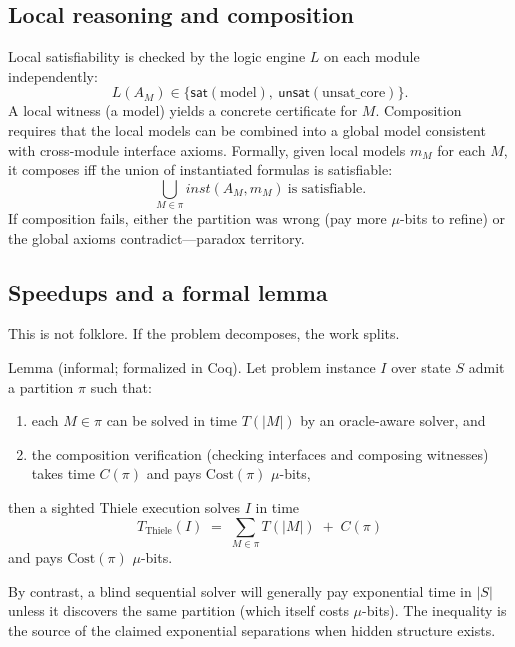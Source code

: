 \documentclass[11pt]{article}
\begin{document}
\subsection{Local reasoning and composition}
Local satisfiability is checked by the logic engine $L$ on each module independently:
\[
L(A_M) \in \{\mathsf{sat}(\text{model}),\ \mathsf{unsat}(\text{unsat\_core})\}.
\]
A local witness (a model) yields a concrete certificate for $M$. Composition requires that the local models can be combined into a global model consistent with cross-module interface axioms. Formally, given local models $m_M$ for each $M$, it composes iff the union of instantiated formulas is satisfiable:
\[
\bigcup_{M\in\pi} \mathit{inst}(A_M,m_M)\ \text{is satisfiable}.
\]
If composition fails, either the partition was wrong (pay more $\mu$-bits to refine) or the global axioms contradict—paradox territory.

\subsection{Speedups and a formal lemma}
This is not folklore. If the problem decomposes, the work splits.

Lemma (informal; formalized in Coq). Let problem instance $I$ over state $S$ admit a partition $\pi$ such that:
\begin{enumerate}
  \item each $M\in\pi$ can be solved in time $T(|M|)$ by an oracle-aware solver, and
  \item the composition verification (checking interfaces and composing witnesses) takes time $C(\pi)$ and pays $\mathrm{Cost}(\pi)$ $\mu$-bits,
\end{enumerate}
then a sighted Thiele execution solves $I$ in time
\[
T_{\mathrm{Thiele}}(I) \;=\; \sum_{M\in\pi} T(|M|) \;+\; C(\pi)
\]
and pays $\mathrm{Cost}(\pi)$ $\mu$-bits.

By contrast, a blind sequential solver will generally pay exponential time in $|S|$ unless it discovers the same partition (which itself costs $\mu$-bits). The inequality is the source of the claimed exponential separations when hidden structure exists.
\end{document}
